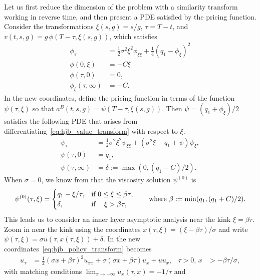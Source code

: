 \documentclass[main.tex]{subfiles}
\begin{document}
Let us first reduce the dimension of the problem with a similarity
transform working in reverse time, and then present a PDE satisfied by the pricing function.
Consider the transformations $\xi(s,g) = s/g$, $\tau=T-t$, and
$v(t,s,g)=g\,\phi(T-\tau,\xi(s,g))$, which satisfies
\begin{align}\label{eq:hjb_value_transform}
  \phi_\tau &= \frac{1}{2}\sigma^2\xi^2\phi_{\xi\xi} +
              \frac{1}{4}{(q_1 - \phi_\xi)}^2 \\
  \phi(0,\xi) &= -C\xi\\
  \phi(\tau,0)& = 0,\\
  \phi_\xi(\tau,\infty) &= -C.
\end{align}
In the new coordinates, define the pricing function in terms of the
function $\psi(\tau,\xi)$ so that $a^B(t,s,g)=\psi(T-\tau,\xi(s,g))$.
Then $\psi = (q_1+\phi_\xi)/2$ satisfies the following PDE
that arises from differentiating~\eqref{eq:hjb_value_transform} with
respect to $\xi$.
\begin{align}\label{eq:hjb_policy_transform}
  \psi_\tau&= \frac{1}{2}\sigma^2 \xi^2
             \psi_{\xi\xi} +
             (\sigma^2\xi - q_1 + \psi)\psi_\xi,\\
  \psi(\tau,0) &= q_1,\\
  \psi(\tau,\infty) &= \delta:=\max(0,(q_1-C)/2).
\end{align}
When $\sigma=0$, we know from  that
the viscosity solution $\psi^{(0)}$ is
\begin{equation}\label{eq:psi_leading}
  \psi^{(0)}(\tau,\xi)=\begin{cases}
    q_1-\xi/\tau, &\text{if } 0\leq \xi\leq
    \beta \tau,\\
    \delta,&\text{if } \hfill \xi > \beta \tau,
  \end{cases}
  \qquad \textnormal{where } \beta:=\min(q_1,(q_1+C)/2).
\end{equation}
This leads us to consider an inner layer asymptotic analysis near
the kink $\xi = \beta \tau$. Zoom in near the kink using the coordinates
$x(\tau,\xi) = (\xi-\beta \tau)/\sigma$ and write $\psi(\tau,\xi) = \sigma
u(\tau,x(\tau,\xi)) + \delta$. In the new
coordinates~\eqref{eq:hjb_policy_transform} becomes
\begin{align}
  u_\tau %
  &=\frac{1}{2}{(\sigma x + \beta \tau)}^2u_{xx}
    +\sigma (\sigma x+\beta \tau)u_x  %
    + uu_x,&\tau>0,\,x&> -\beta \tau/\sigma,
\end{align}
with matching conditions $\lim_{x \to -\infty} u_x(\tau,x) = -1/\tau$ and
\end{document}
